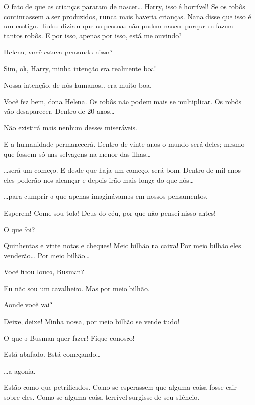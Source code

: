  O fato de que as crianças pararam de nascer\ldots{} Harry, isso é 
horrível! Se os robôs continuassem a ser produzidos, nunca mais haveria crianças.
Nana disse que isso é um castigo. Todos diziam que as pessoas não podem
nascer porque se fazem tantos robôs. E por isso, apenas por isso, está me
ouvindo?

 Helena, você estava pensando nisso?

 Sim, oh, Harry, minha intenção era realmente boa!

  Nossa intenção, de nós humanos\ldots{} era muito
boa.

 Você fez bem, dona Helena. Os robôs não podem mais se multiplicar. Os
robôs vão desaparecer. Dentro de 20 anos\ldots{}

 Não existirá mais nenhum desses miseráveis.

 E a humanidade permanecerá. Dentro de vinte anos o mundo será deles;
mesmo que fossem só uns selvagens na menor das ilhas\ldots{}

 \ldots{}será um começo. E desde que haja um começo, será bom. Dentro de mil
anos eles poderão nos alcançar e depois irão mais longe do que nós\ldots{}

 \ldots{}para cumprir o que apenas imaginávamos em nossos pensamentos.

 Esperem! Como sou tolo! Deus do céu, por que não pensei nisso
antes!

 O que foi?

 Quinhentas e vinte notas e cheques! Meio bilhão na caixa! Por meio
bilhão eles venderão\ldots{} Por meio bilhão\ldots{}

 Você ficou louco, Busman?

 Eu não sou um cavalheiro. Mas por meio bilhão. 

 Aonde você vai?

 Deixe, deixe! Minha nossa, por meio bilhão se vende tudo! 

 O que o Busman quer fazer! Fique conosco!


 Está abafado. Está começando\ldots{}

 \ldots{}a agonia.

  Estão como que petrificados. Como se
esperassem que alguma coisa fosse cair sobre eles. Como se alguma coisa terrível
surgisse de seu silêncio.

